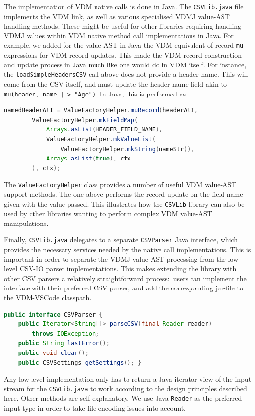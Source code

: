 \documentclass[runningheads,a4paper]{llncs}
\begin{document}
The implementation of VDM native calls is done in Java. The \texttt{CSVLib.java} file implements the VDM link, as well as various specialised VDMJ value-AST handling methods. These might be useful for other libraries requiring handling VDMJ values within VDM native method call implementations in Java. For example, we added for the value-AST in Java the VDM equivalent of record \texttt{mu}-expressions for VDM-record updates. This made the VDM record construction and update process in Java much like one would do in VDM itself. For instance, the \texttt{loadSimpleHeadersCSV} call above does not provide a header name. This will come from the CSV itself, and must update the header name field akin to \texttt{mu(header, name |-> "Age")}. In Java, this is performed as 
%
\begin{lstlisting}[language=Java,basicstyle=\footnotesize\ttfamily]
    namedHeaderAtI = ValueFactoryHelper.muRecord(headerAtI, 
        ValueFactoryHelper.mkFieldMap(
            Arrays.asList(HEADER_FIELD_NAME), 
            ValueFactoryHelper.mkValueList(
                ValueFactoryHelper.mkString(nameStr)), 
            Arrays.asList(true), ctx
        ), ctx);
\end{lstlisting}
%
\noindent The \texttt{ValueFactoryHelper} class provides a number of useful VDM value-AST support methods. The one above performs the record update on the field name given with the value passed. This illustrates how the \texttt{CSVLib} library can also be used by other libraries wanting to perform complex VDM value-AST manipulations. 

Finally, \texttt{CSVLib.java} delegates to a separate \texttt{CSVParser} Java interface, which provides the necessary services needed by the native call implementations. This is important in order to separate the VDMJ value-AST processing from the low-level CSV-IO parser implementations. This makes extending the library with other CSV parsers a relatively straightforward process:~users can implement the interface with their preferred CSV parser, and add the corresponding jar-file to the VDM-VSCode classpath. 
%
\begin{lstlisting}[language=Java,basicstyle=\footnotesize\ttfamily]
public interface CSVParser {
    public Iterator<String[]> parseCSV(final Reader reader) 
        throws IOException;
    public String lastError();
    public void clear();
    public CSVSettings getSettings(); } 
\end{lstlisting}
%
Any low-level implementation only has to return a Java iterator view of the input stream for the \texttt{CSVLib.java} to work according to the design principles described here. Other methods are self-explanatory. We use Java \texttt{Reader} as the preferred input type in order to take file encoding issues into account.  
\end{document}
